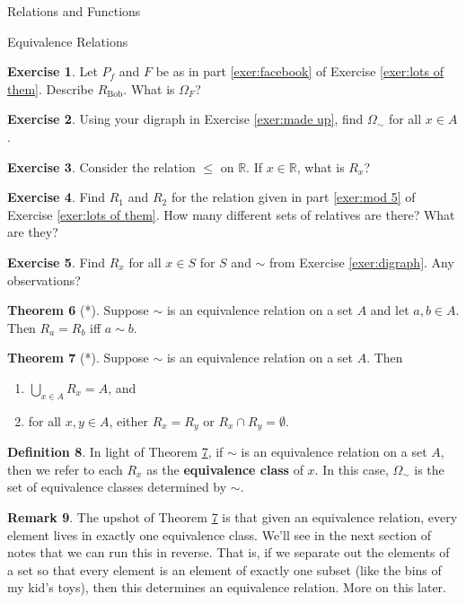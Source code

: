 \documentclass[11pt]{article}
\theoremstyle{definition}
\newtheorem{theorem}{Theorem}[section]
\newtheorem{definition}[theorem]{Definition}
\newtheorem{exercise}[theorem]{Exercise}
\newtheorem{remark}[theorem]{Remark}
\begin{document}
\begin{section}{Relations and Functions}
\begin{subsection}{Equivalence Relations}
\begin{exercise}
Let $P_f$ and $F$ be as in part \ref{exer:facebook} of Exercise \ref{exer:lots of them}.  Describe $R_{\text{Bob}}$.  What is $\Omega_F$?
\end{exercise}

\begin{exercise}
Using your digraph in Exercise \ref{exer:made up}, find $\Omega_{\sim}$ for all $x\in A$.  
\end{exercise}

\begin{exercise}
Consider the relation $\leq$ on $\mathbb{R}$.  If $x\in \mathbb{R}$, what is $R_x$?
\end{exercise}

\begin{exercise}
Find $R_1$ and $R_{2}$ for the relation given in part \ref{exer:mod 5} of Exercise \ref{exer:lots of them}.  How many different sets of relatives are there?  What are they?
\end{exercise}

\begin{exercise}
Find $R_x$ for all $x\in S$ for $S$ and $\sim$ from Exercise \ref{exer:digraph}.  Any observations?
\end{exercise}

\begin{theorem}[*]
Suppose $\sim$ is an equivalence relation on a set $A$ and let $a,b\in A$.  Then $R_a=R_b$ iff $a\sim b$.
\end{theorem}

\begin{theorem}[*]\label{thm:equiv yields partition}
Suppose $\sim$ is an equivalence relation on a set $A$.  Then
\begin{enumerate}
\item $\bigcup_{x\in A}R_x=A$, and
\item for all $x,y\in A$, either $R_x=R_y$ or $R_x\cap R_y=\emptyset$.
\end{enumerate}
\end{theorem}

\begin{definition}
In light of Theorem \ref{thm:equiv yields partition}, if $\sim$ is an equivalence relation on a set $A$, then we refer to each $R_x$ as the \textbf{equivalence class} of $x$.  In this case, $\Omega_{\sim}$ is the set of equivalence classes determined by $\sim$.
\end{definition}

\begin{remark}
The upshot of Theorem \ref{thm:equiv yields partition} is that given an equivalence relation, every element lives in exactly one equivalence class.  We'll see in the next section of notes that we can run this in reverse.  That is, if we separate out the elements of a set so that every element is an element of exactly one subset (like the bins of my kid's toys), then this determines an equivalence relation.  More on this later.
\end{remark}


\end{subsection}
\end{section}
\end{document}
